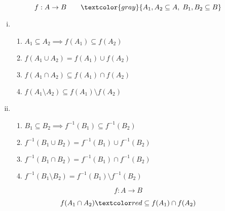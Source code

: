 \begin{frame}{}
  \begin{theorem}
    \[
      f: A \to B \qquad \textcolor{gray}{A_1, A_2 \subseteq A,\; B_1, B_2 \subseteq B}
    \]

    \vspace{-0.10cm}
    \begin{enumerate}[(i)]
      \setlength{\itemsep}{10pt}
      \item {}
	\begin{enumerate}[(1)]
	  \setlength{\itemsep}{4pt}
	  \item $A_1 \subseteq A_2 \implies f(A_1) \subseteq f(A_2)$
	  \item $f(A_1 \cup A_2) = f(A_1) \cup f(A_2)$
	  \item $f(A_1 \cap A_2) \subseteq f(A_1) \cap f(A_2)$
	  \item $f(A_1 \setminus A_2) \subseteq f(A_1) \setminus f(A_2)$
	\end{enumerate}
      \item {}
	\begin{enumerate}[(1)]
	  \setlength{\itemsep}{4pt}
	  \setcounter{enumii}{4}
	  \item $B_1 \subseteq B_2 \implies f^{-1}(B_1) \subseteq f^{-1}(B_2)$
	  \item $f^{-1}(B_1 \cup B_2) = f^{-1}(B_1) \cup f^{-1}(B_2)$
	  \item $f^{-1}(B_1 \cap B_2) = f^{-1}(B_1) \cap f^{-1}(B_2)$
	  \item $f^{-1}(B_1 \setminus B_2) = f^{-1}(B_1) \setminus f^{-1}(B_2)$
	\end{enumerate}
    \end{enumerate}
  \end{theorem}
\end{frame}

\begin{frame}{}
  \begin{theorem}[UD Problem 17.5]
    \[
      f: A \to B
    \]

    \[
      f(A_1 \cap A_2) \red{\;\subseteq\;} f(A_1) \cap f(A_2)
    \]
  \end{theorem}

  \pause
  \vspace{0.60cm}
  \begin{center}
     \pause\\[10pt]
  \end{center}
\end{frame}

